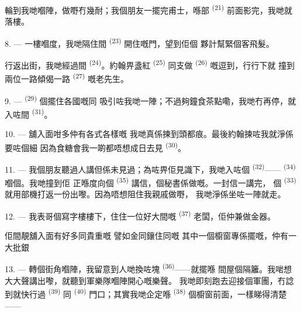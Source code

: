 輪到我哋嗰陣，做嘢冇幾耐；我個朋友一擺完甫士，喺部
\textsuperscript{(21)} 前面影完，我哋就落樓。

8. --- 一樓嗰度，我哋隔住間 \textsuperscript{(23)} 開住嘅門，望到佢個
夥計幫緊個客飛髮。

行返出街，我哋經過間 \textsuperscript{(24)}。約翰畀盞紅
\textsuperscript{(25)} 同支做 \textsuperscript{(26)} 嘅逗到，行行下就
撞到兩位一路傾偈一路 \textsuperscript{(27)} 嘅老先生。

\VUsaut{3.0mm}

9. ---  \textsuperscript{(29)} 個擺住各國嘅同
吸引咗我哋一陣；不過夠鐘食茶點嘞，我哋冇再停，就入咗間
\textsuperscript{(31)}。

10. --- 舖入面咁多仲有各式各樣嘅
我哋真係揀到頭都痕。最後約翰揀咗我就淨係要咗個細
因為食糖會我一啲都唔想成日去見
\textsuperscript{(30)}。

\VUsaut{3.0mm}

11. --- 我個朋友聽過人講但係未見過；為咗畀佢見識下，我哋入咗個
 \textsuperscript{(32)}—— \textsuperscript{(34)} 嗰個。我哋撞到佢
正喺度向個 \textsuperscript{(35)} 講信，個秘書係做嘅。一封信一講完，
個 \textsuperscript{(33)} 就用部機打返一份出嚟。因為唔想阻住我親戚做嘢，
我哋淨係坐咗一陣就走。

12. --- 我表哥個寫字樓樓下，住住一位好大間嘅
\textsuperscript{(37)} 老闆，佢仲兼做金器。

佢間靚舖入面有好多同貴重嘅
譬如金同鑲住同嘅
其中一個櫥窗專係擺嘅，仲有一大批銀

13. --- 轉個街角嗰陣，我留意到人哋換咗塊 \textsuperscript{(36)}——就擺喺
間屋個隔籬。我啱想大大聲講出嚟，就聽到軍樂隊嗰陣開心嘅樂聲。
我哋即刻跑去迎接個軍團，冇諗到就快行過 \textsuperscript{(39)}
同 \textsuperscript{(40)} 門口；其實我哋企定喺
\textsuperscript{(38)} 個櫥窗前面，一樣睇得清楚——


